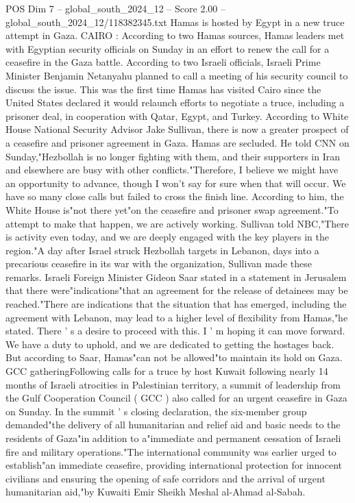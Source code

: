 \begin{textsample}{POS Dim 7 – global\_south\_2024\_12 – Score 2.00 – global\_south\_2024\_12/118382345.txt}  \label{ex:f7_pos_153}
Hamas is hosted by Egypt in a new truce attempt in Gaza.
CAIRO : According to two Hamas sources, Hamas leaders met with Egyptian security officials on Sunday in an effort to renew the call for a ceasefire in the Gaza battle.
According to two Israeli officials, Israeli Prime Minister Benjamin Netanyahu planned to call a meeting of his security council to discuss the issue.
This was the first time Hamas has visited Cairo since the United States declared it would relaunch efforts to negotiate a truce, including a prisoner deal, in cooperation with Qatar, Egypt, and Turkey.
According to White House National Security Advisor Jake Sullivan, there is now a greater prospect of a ceasefire and prisoner agreement in Gaza.
Hamas are secluded.
He told CNN on Sunday,"Hezbollah is no longer fighting with them, and their supporters in Iran and elsewhere are busy with other conflicts."Therefore, I believe we might have an opportunity to advance, though I won't say for sure when that will occur.
We have so many close calls but failed to cross the finish line.
According to him, the White House is"not there yet"on the ceasefire and prisoner swap agreement."To attempt to make that happen, we are actively working.
Sullivan told NBC,"There is activity even today, and we are deeply engaged with the key players in the region."A day after Israel struck Hezbollah targets in Lebanon, days into a precarious ceasefire in its war with the organization, Sullivan made these remarks.
Israeli Foreign Minister Gideon Saar stated in a statement in Jerusalem that there were"indications"that an agreement for the release of detainees may be reached."There are indications that the situation that has emerged, including the agreement with Lebanon, may lead to a higher level of flexibility from Hamas,"he stated.
There ' s a desire to proceed with this.
I ' m hoping it can move forward.
We have a duty to uphold, and we are dedicated to getting the hostages back.
But according to Saar, Hamas"can not be allowed"to maintain its hold on Gaza.
GCC gatheringFollowing calls for a truce by host Kuwait following nearly 14 months of Israeli atrocities in Palestinian territory, a summit of leadership from the Gulf Cooperation Council ( GCC ) also called for an urgent ceasefire in Gaza on Sunday.
In the summit ' s closing declaration, the six-member group demanded"the delivery of all humanitarian and relief aid and basic needs to the residents of Gaza"in addition to a"immediate and permanent cessation of Israeli fire and military operations."The international community was earlier urged to establish"an immediate ceasefire, providing international protection for innocent civilians and ensuring the opening of safe corridors and the arrival of urgent humanitarian aid,"by Kuwaiti Emir Sheikh Meshal al-Ahmad al-Sabah.

\end{textsample}
